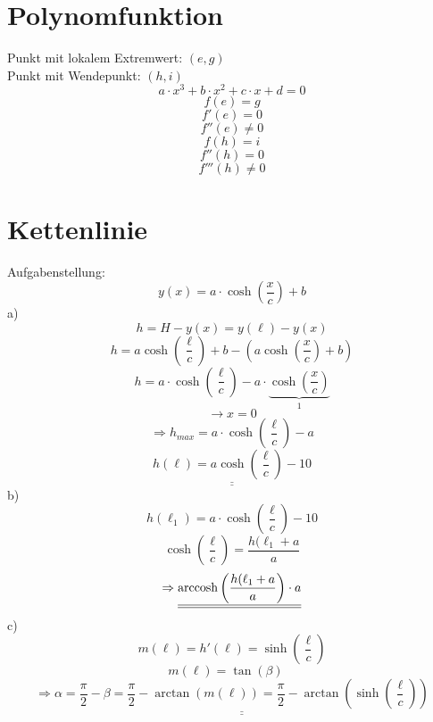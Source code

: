 \section{Polynomfunktion}
Punkt mit lokalem Extremwert: $(e,g)$\\
Punkt mit Wendepunkt: $(h,i)$
\[a \cdot x^3 + b \cdot x^2 + c \cdot x + d = 0\]
\[\]
\[f(e) = g\]
\[f'(e) = 0\]
\[f''(e) \neq 0\]
\[f(h) = i\]
\[f''(h) = 0\]
\[f'''(h) \neq 0\]


\section{Kettenlinie}
Aufgabenstellung: 
\[y(x) = a \cdot \cosh\left(\frac{x}{c}\right) + b\]
a)\\
\[h = H - y(x) = y(\ell) - y(x)\]
\[h = a \cosh\left(\frac{\ell}{c}\right) + b - \left(a \cosh\left(\frac{x}{c}\right) + b\right)\]
\[h = a \cdot \cosh\left(\frac{\ell}{c}\right) - a \cdot \underbrace{\cosh\left(\frac{x}{c}\right)}_1\]
\[\rightarrow x = 0\]
\[\Rightarrow h_{max} = a \cdot \cosh\left(\frac{\ell}{c}\right)-a\]
\[\underline{\underline{h(\ell) = a \cosh\left(\frac{\ell}{c}\right) - 10}}\]
b)
\[h(\ell_1) =a \cdot \cosh\left(\frac{\ell}{c}\right) - 10\]
\[\cosh\left(\frac{\ell}{c}\right) = \frac{h(\ell_1 + a}{a}\]
\[\Rightarrow \underline{\underline{\operatorname{arccosh}\left(\frac{h(\ell_1 + a}{a}\right) \cdot a}}\]
c)
\[m(\ell) = h'(\ell) = \sinh\left(\frac{\ell}{c}\right)\]
\[m(\ell) = \tan(\beta) \quad\]
\[\Rightarrow \underline{\underline{\alpha = \frac{\pi}{2} - \beta = \frac{\pi}{2} - \arctan(m(\ell)) = \frac{\pi}{2} - \arctan\left(\sinh\left(\frac{\ell}{c}\right)\right)}}\]
